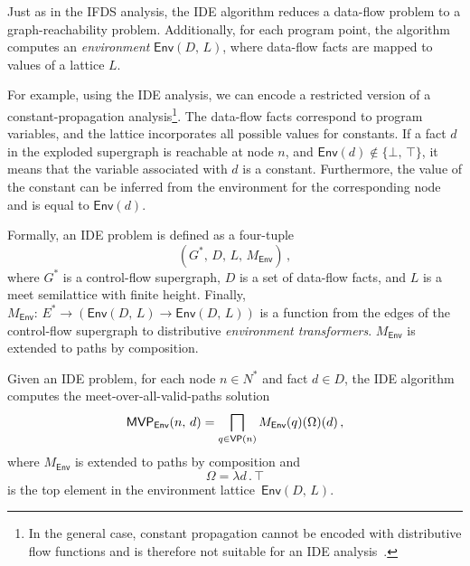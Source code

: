 Just as in the IFDS analysis, the IDE algorithm reduces a data-flow problem to a graph-reachability problem. Additionally, for each program point, the algorithm computes an \textit{environment} $\textsf{Env}(D,\,L)$, where data-flow facts are mapped to values of a lattice $L$.

\begin{mdelete}
For example, using the IDE analysis, we can encode a restricted version of a constant-propagation analysis\footnote{%
  In the general case, constant propagation cannot be encoded with distributive flow functions and is therefore not suitable for an IDE analysis~\cite{muller2001complexity}.
}. The data-flow facts  correspond to program variables, and the lattice incorporates all possible values for constants. 
If a fact $d$ in the exploded supergraph is reachable at node $n$, and $\textsf{Env}(d)\notin\{\bot,\,\top\}$, it means that the variable associated with $d$ is a constant. Furthermore, the value of the constant can be inferred from the environment for the corresponding node and is equal to $\textsf{Env}(d)$.
\end{mdelete}

Formally, an IDE problem is defined as a four-tuple
\begin{equation}
  (G^*,\,D,\,L,\,M_\textsf{Env})\,,
\end{equation}
where $G^*$ is a control-flow supergraph, $D$ is a set of data-flow facts, and $L$ is a meet semilattice
with finite height. 
Finally, $M_\textsf{Env}:\,E^*\to(\textsf{Env}(D,\,L)\to \textsf{Env}(D,\,L))$ is a function from the edges of the control-flow supergraph to distributive \textit{environment transformers}. $M_\textsf{Env}$ is extended to paths by composition.

Given an IDE problem, for each node $n\in N^*$ and fact $d\in D$, the IDE algorithm computes the meet-over-all-valid-paths solution
\begin{equation}\label{eq:mvpdef}
  \textsf{MVP}_{\textsf{Env}}(n,\,d)=\bigsqcap_{q\in\textsf{VP}(n)}M_\textsf{Env}(q)(\Omega)(d)\,,
\end{equation}
where $M_\textsf{Env}$ is extended to paths by composition and
\begin{equation}
  \Omega=\lambda d\,.\,\top
\end{equation}
is the top element in the environment lattice~$\mathsf{Env}(D,\,L)$.

